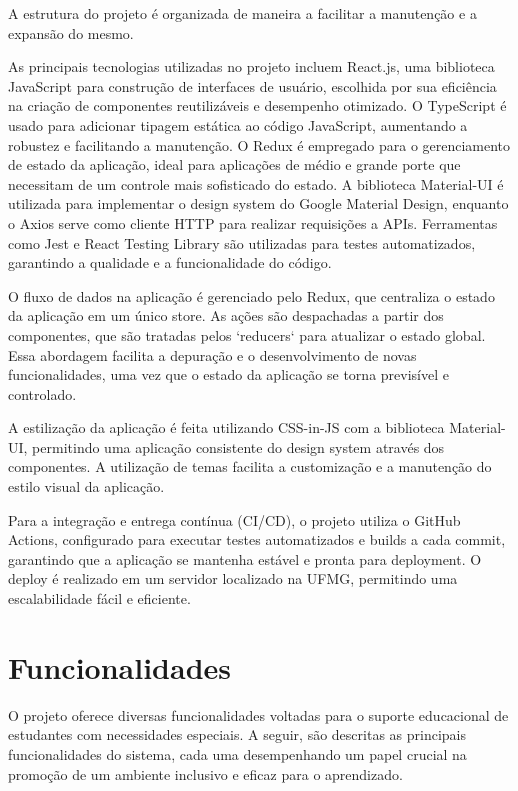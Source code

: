 \documentclass[sigconf]{webmedia}
\begin{document}
 A estrutura do projeto é organizada de maneira a facilitar 
 a manutenção e a expansão do mesmo.
 
 As principais tecnologias utilizadas no projeto incluem React.js, uma biblioteca
 JavaScript para construção de interfaces de usuário, escolhida por sua eficiência
na criação de componentes reutilizáveis e desempenho otimizado. O TypeScript é
usado para adicionar tipagem estática ao código JavaScript, aumentando a robustez
e facilitando a manutenção. O Redux é empregado para o gerenciamento de estado da
aplicação, ideal para aplicações de médio e grande porte que necessitam de um
controle mais sofisticado do estado. A biblioteca Material-UI é utilizada para
implementar o design system do Google Material Design, enquanto o Axios serve
como cliente HTTP para realizar requisições a APIs. Ferramentas como Jest e
React Testing Library são utilizadas para testes automatizados, garantindo a
qualidade e a funcionalidade do código.

O fluxo de dados na aplicação é gerenciado pelo Redux, que centraliza o estado da
aplicação em um único store. As ações são despachadas a partir dos componentes,
que são tratadas pelos `reducers` para atualizar o estado global. Essa abordagem
facilita a depuração e o desenvolvimento de novas funcionalidades, uma vez que o
estado da aplicação se torna previsível e controlado.

A estilização da aplicação é feita utilizando CSS-in-JS com a biblioteca Material-UI,
 permitindo uma aplicação consistente do design system através dos componentes.
 A utilização de temas facilita a customização e a manutenção do estilo visual da
 aplicação.

Para a integração e entrega contínua (CI/CD), o projeto utiliza
o GitHub Actions, configurado para executar testes automatizados e builds a cada
commit, garantindo que a aplicação se mantenha estável e pronta para deployment.
O deploy é realizado em um servidor localizado na UFMG, permitindo uma escalabilidade
 fácil e eficiente.

\section{Funcionalidades}

O projeto oferece diversas funcionalidades voltadas para o suporte
educacional de estudantes com necessidades especiais. A seguir, são
descritas as principais funcionalidades do sistema, cada uma desempenhando
 um papel crucial na promoção de um ambiente inclusivo e eficaz para o
 aprendizado.
\vspace{0.5cm}
\end{document}
